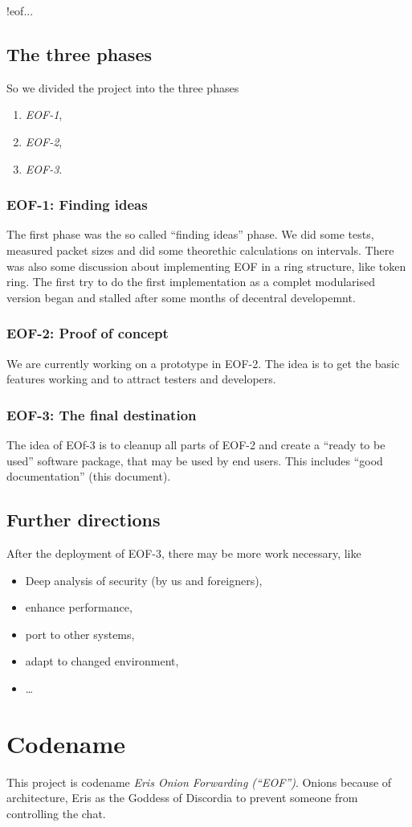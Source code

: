 !eof...
\subsection{The three phases}
So we divided the project into the three phases
\begin{enumerate}
\item \emph{EOF-1},
\item \emph{EOF-2},
\item \emph{EOF-3}.
\end{enumerate}
\subsubsection{EOF-1: Finding ideas}
The first phase was the so called "`finding ideas"' phase. We did some tests,
measured packet sizes and did some theorethic calculations on intervals.
There was also some discussion about implementing EOF in a ring structure,
like token ring\cite{token-ring}.
The first try to do the first implementation as a complet modularised
version began and stalled after some months of decentral developemnt.
\subsubsection{EOF-2: Proof of concept}
We are currently working on a prototype in EOF-2. The idea is to get the
basic features working and to attract testers and developers.
\subsubsection{EOF-3: The final destination}
The idea of EOf-3 is to cleanup all parts of EOF-2 and create a
"`ready to be used"' software package, that may be used by end users.
This includes "`good documentation"' (this document).
\subsection{Further directions}
After the deployment of EOF-3, there may be more work necessary, like
\begin{itemize}
\item Deep analysis of security (by us and foreigners),
\item enhance performance,
\item port to other systems,
\item adapt to changed environment,
\item \ldots{}
\end{itemize}

\section{Codename}
This project is codename \textit{Eris Onion Forwarding ("`EOF"')}.
Onions because of architecture, Eris as the Goddess of Discordia to
prevent someone from controlling the chat.
